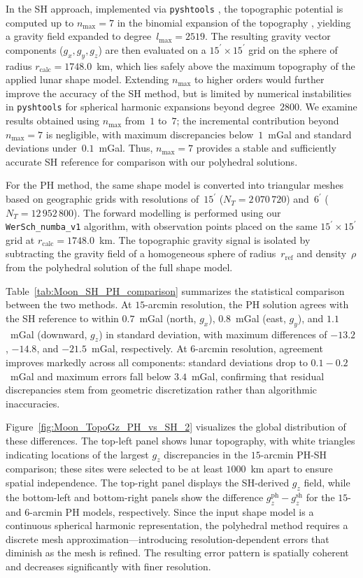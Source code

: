 \documentclass{seg}
\begin{document}
In the SH approach, implemented via \texttt{pyshtools} \citep{Wieczorek2018GeochemGeophysGeosyst}, the topographic potential is computed up to $n_{\max}=7$ in the binomial expansion of the topography \citep{Wieczorek1998J.Geophys.Res.}, yielding a gravity field expanded to degree~$l_{\max} = 2519$. The resulting gravity vector components ($g_x, g_y, g_z$) are then evaluated on a $15^{\prime} \times 15^{\prime}$ grid on the sphere of radius $r_{\mathrm{calc}} = 1748.0$~km, which lies safely above the maximum topography of the applied lunar shape model. Extending $n_{\max}$ to higher orders would further improve the accuracy of the SH method, but is limited by numerical instabilities in \texttt{pyshtools} for spherical harmonic expansions beyond degree~$2800$. We examine results obtained using $n_{\max}$ from~$1$ to~$7$; the incremental contribution beyond $n_{\max}=7$ is negligible, with maximum discrepancies below~$1$~mGal and standard deviations under~$0.1$~mGal. Thus, $n_{\max}=7$ provides a stable and sufficiently accurate SH reference for comparison with our polyhedral solutions.

For the PH method, the same shape model is converted into triangular meshes based on geographic grids with resolutions of~$15^{\prime}$ ($N_{T}=2\,070\,720$) and~$6^{\prime}$ ($N_{T}=12\,952\,800$). The forward modelling is performed using our \texttt{WerSch\_numba\_v1} algorithm, with observation points placed on the same $15^{\prime} \times 15^{\prime}$ grid at $r_{\mathrm{calc}} = 1748.0$~km. The topographic gravity signal is isolated by subtracting the gravity field of a homogeneous sphere of radius~$r_{\mathrm{ref}}$ and density~$\rho$ from the polyhedral solution of the full shape model.

Table~\ref{tab:Moon_SH_PH_comparison} summarizes the statistical comparison between the two methods. At $15$-arcmin resolution, the PH solution agrees with the SH reference to within $0.7$~mGal (north, $g_x$), $0.8$~mGal (east, $g_y$), and $1.1$~mGal (downward, $g_z$) in standard deviation, with maximum differences of $-13.2$, $-14.8$, and $-21.5$~mGal, respectively. At $6$-arcmin resolution, agreement improves markedly across all components: standard deviations drop to $0.1-0.2$~mGal and maximum errors fall below $3.4$~mGal, confirming that residual discrepancies stem from geometric discretization rather than algorithmic inaccuracies.

Figure~\ref{fig:Moon_TopoGz_PH_vs_SH_2} visualizes the global distribution of these differences. The top-left panel shows lunar topography, with white triangles indicating locations of the largest $g_z$ discrepancies in the $15$-arcmin PH-SH comparison; these sites were selected to be at least $1000$~km apart to ensure spatial independence. The top-right panel displays the SH-derived $g_z$ field, while the bottom-left and bottom-right panels show the difference $g_z^{\mathrm{ph}} - g_z^{\mathrm{sh}}$ for the $15$- and $6$-arcmin PH models, respectively. Since the input shape model is a continuous spherical harmonic representation, the polyhedral method requires a discrete mesh approximation—introducing resolution-dependent errors that diminish as the mesh is refined. The resulting error pattern is spatially coherent and decreases significantly with finer resolution.
\end{document}

